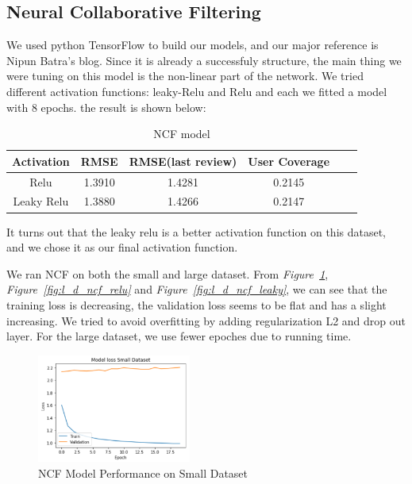 \documentclass[journal]{IEEEtran}
\begin{document}
\subsection{Neural Collaborative Filtering}
We used python TensorFlow to build our models, and our major reference is Nipun Batra's blog. Since it is already a successfuly structure, the main thing we were tuning on this model is the non-linear part of the network. We tried different activation functions: leaky-Relu and Relu and each we fitted a model with 8 epochs. the result is shown below:
\begin{table}[H]  \centering
\caption{\label{} NCF model}
\label{my-label}
\begin{tabular}{c|ccccc}
\hline \hline
Activation      & RMSE      &  RMSE(last review)    & User Coverage \\ \hline
Relu            & 1.3910    & 1.4281                & 0.2145        \\ \hline
Leaky Relu      & 1.3880    & 1.4266                &  0.2147       \\ \hline
\end{tabular}
\end{table}
It turns out that the leaky relu is a better activation function on this dataset, and we chose it as our final activation function. 

We ran NCF on both the small and large dataset. From {\it Figure~\ref{fig:s_d_ncf_leaky}}, {\it Figure~\ref{fig:l_d_ncf_relu}} and {\it Figure~\ref{fig:l_d_ncf_leaky}}, we can see that the training loss is decreasing, the validation loss seems to be flat and has a slight increasing. We tried to avoid overfitting by adding regularization L2 and drop out layer. For the large dataset, we use fewer epoches due to running time. 
\begin{figure}
\begin {center}
\includegraphics[width=0.45\textwidth]{images/small_dataset_model.png}
\caption{NCF Model Performance on Small Dataset}
\label{fig:s_d_ncf_leaky}
\end {center}
\end{figure}
\end{document}
